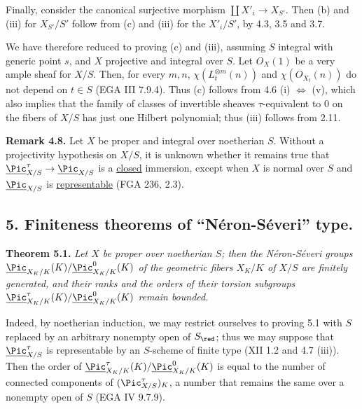 Finally, consider the canonical surjective morphism \(\coprod X'_i\to X_{S'}\). Then (b) and (iii) for \(X_{S'}/S'\) follow from (c) and (iii) for the \(X'_i/S'\), by 4.3, 3.5 and 3.7.

We have therefore reduced to proving (c) and (iii), assuming \(S\) integral with generic point \(s\), and \(X\) projective and integral over \(S\). Let \({O}_X(1)\) be a very ample sheaf for \(X/S\). Then, for every \(m,n\), \(\chi(L_t^{\otimes m}(n))\) and \(\chi({O}_{X_t}(n))\) do not depend on \(t\in S\) (EGA III 7.9.4). Thus (c) follows from 4.6 (i) \(\Longleftrightarrow\) (v), which also implies that the family of classes of invertible sheaves \(\tau\)-equivalent to \(0\) on the fibers of \(X/S\) has just
%
one Hilbert polynomial; thus (iii) follows from 2.11.

\textbf{Remark 4.8.} Let \(X\) be proper and integral over noetherian \(S\). Without a projectivity hypothesis on \(X/S\), it is unknown whether it remains true that \(\underline{\Pic}^\tau_{X/S}\to\underline{\Pic}_{X/S}\) is a \uline{closed} immersion, except when \(X\) is normal over \(S\) and \(\underline{\Pic}_{X/S}\) is \uline{representable} (FGA 236, 2.3).

\providecommand{\NS}{\operatorname{NS}}
\providecommand{\Picard}{\operatorname{Pic}}
\providecommand{\Et}{\mathrm{et}}
\providecommand{\rk}{\operatorname{rk}}
\providecommand{\im}{\operatorname{Im}}
\providecommand{\HH}{\mathrm H}


\subsection*{5. Finiteness theorems of ``N\'eron-S\'everi'' type.}

\textbf{Theorem 5.1.} \emph{Let \(X\) be proper over noetherian \(S\); then the N\'eron-S\'everi groups \(\underline{\Pic}_{X_K/K}(K)/\underline{\Pic}^0_{X_K/K}(K)\) of the geometric fibers \(X_K/K\) of \(X/S\) are finitely generated, and their ranks and the orders of their torsion subgroups \(\underline{\Pic}^\tau_{X_K/K}(K)/\underline{\Pic}^0_{X_K/K}(K)\) remain bounded.}

Indeed, by noetherian induction, we may restrict ourselves to proving 5.1 with \(S\) replaced by an arbitrary nonempty open of \(S_{\red}\); thus we may suppose that \(\underline{\Pic}^\tau_{X/S}\) is representable by an \(S\)-scheme of finite type (XII 1.2 and 4.7 (iii)). Then the order of \(\underline{\Pic}^\tau_{X_K/K}(K)/\underline{\Pic}^0_{X_K/K}(K)\) is equal to the number of connected components of \((\Pic^\tau_{X/S})_K\), a number that remains the same over a nonempty open of \(S\) (EGA IV 9.7.9).

